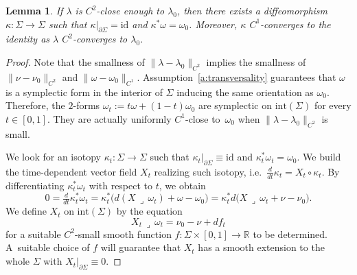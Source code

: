 \documentclass[10pt,a4paper]{amsart}
\providecommand{\ie}{i.e.\ }
\let\mathds\mathbb
\newtheorem{lem}[thm]{Lemma}
\theoremstyle{definition}
\newcommand{\id}{\mathrm{id}}
\newcommand{\R}{\mathds{R}}
\let\diff d
\providecommand{\ie}{i.e. }
\begin{document}
\begin{lem}
\label{l:pullback_to_nu0}
If $\lambda$ is $C^2$-close enough to $\lambda_0$, then there exists a diffeomorphism $\kappa:\Sigma\to\Sigma$ such that $\kappa|_{\partial\Sigma}=\id$ and $\kappa^*\omega=\omega_0$. Moreover, $\kappa$ $C^1$-converges to the identity as $\lambda$ $C^2$-converges to $\lambda_0$.
\end{lem}

\begin{proof}
Note that the smallness of $\|\lambda-\lambda_0\|_{C^2}$ implies the smallness of $\|\nu-\nu_0\|_{C^2}$ and $\|\omega-\omega_0\|_{C^1}$. Assumption~\ref{a:transversality} guarantees that $\omega$ is a symplectic form in the interior of $\Sigma$ inducing the same orientation as $\omega_0$. Therefore, the $2$-forms $\omega_t:=t\omega+(1-t)\omega_0$ are symplectic on $\mathrm{int}(\Sigma)$ for every $t\in[0,1]$. They are actually uniformly $C^1$-close to~$\omega_0$ when $\|\lambda-\lambda_0\|_{C^2}$ is small.

We look for an isotopy $\kappa_t:\Sigma\to\Sigma$ such that $\kappa_t|_{\partial\Sigma}\equiv\mathrm{id}$ and $\kappa_t^*\omega_t=\omega_0$. We build the time-dependent vector field $X_t$ realizing such isotopy, \ie $\tfrac{\diff}{\diff t}\kappa_t=X_t\circ\kappa_t$. By differentiating $\kappa_t^*\omega_t$ with respect to $t$, we obtain
\begin{equation}
\label{e:X_Moser_0}
0=\tfrac{\diff}{\diff t}\kappa_t^*\omega_t
=
\kappa_t^* \big( \diff(X\,\lrcorner\,\omega_t) + \omega-\omega_0 \big)
=
\kappa_t^* \diff\big(X\,\lrcorner\,\omega_t + \nu-\nu_0 \big) .
\end{equation}
We define $X_t$ on $\mathrm{int}(\Sigma)$ by the equation
\begin{equation}
\label{e:X_Moser}
X_t\,\lrcorner\,\omega_t = \nu_0 - \nu + \diff f_t
\end{equation}
for a suitable $C^2$-small smooth function $f:\Sigma\times [0,1] \to\R$ to be determined. A~suitable choice of $f$ will guarantee that $X_t$ has a smooth extension to the whole $\Sigma$ with $X_t|_{\partial\Sigma}\equiv0$.


\end{proof}
\end{document}
